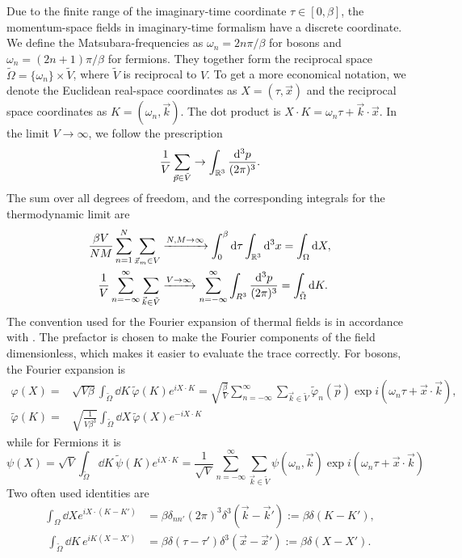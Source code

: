 Due to the finite range of the imaginary-time coordinate $\tau \in [0, \beta]$, the momentum-space fields in imaginary-time formalism have a discrete coordinate. 
We define the Matsubara-frequencies as $\omega_n = 2 n \pi / \beta$ for bosons and $\omega_n = (2n + 1) \pi / \beta$ for fermions.
They together form the reciprocal space $\tilde \Omega = \{\omega_n\}\times \tilde V$, where $\tilde V$ is reciprocal to $V$.
To get a more economical notation, we denote the Euclidean real-space coordinates as $X = (\tau, \vec x)$ and the reciprocal space coordinates as $K = (\omega_n, \vec k)$.
The dot product is $X\cdot K = \omega_n \tau + \vec k \cdot \vec x$.
In the limit $V\rightarrow \infty$, we follow the prescription
\begin{equation*}
    \frac{1}{V} \sum_{\vec p \in \tilde V} \rightarrow \int_{\mathbb{R}^3} 
    \frac{\dd^3 p}{(2 \pi)^3}.
\end{equation*}
The sum over all degrees of freedom, and the corresponding integrals for the thermodynamic limit are
\begin{align*}
     \frac{\beta V}{NM}\sum_{n=1}^N \sum_{\vec x_m \in V} 
    & \xrightarrow{N,M\rightarrow \infty} \int_{0}^\beta \dd \tau \int_{\mathbb{R}^3} \dd^3 x
    = \int_\Omega \dd X, \\
     \frac{1}{V} \sum_{n=-\infty}^\infty \sum_{\vec k \in \tilde V}
    & \xrightarrow{V \rightarrow \infty} \sum_{n=-\infty}^\infty \int_{R^3} \frac{\dd^3 p}{(2 \pi)^3}
    = \int_{\tilde \Omega} \dd K.
\end{align*}
The convention used for the Fourier expansion of thermal fields is in accordance with \cite{Kapusta:finiteTemp}. 
The prefactor is chosen to make the Fourier components of the field dimensionless, which makes it easier to evaluate the trace correctly.
For bosons, the Fourier expansion is
\begin{align*}
    \varphi(X)
    = &
    \sqrt{V \beta} \int_{\tilde \Omega} \dd K \,  \tilde \varphi(K) e^{i X\cdot K}
    =
    \sqrt{\frac{\beta}{V}} \sum_{n=-\infty}^\infty \sum_{\vec k \in \tilde V}
    \tilde \varphi_n(\vec p) \exp{i(\omega_n \tau + \vec x \cdot \vec k)}, \\
    \tilde \varphi(K)
    = &
    \sqrt{\frac{1}{V \beta^3}} \int_{\tilde \Omega} \dd X \,  \tilde \varphi(X) e^{ - i X\cdot K}
\end{align*}
while for Fermions it is
\begin{equation}
    \psi(X) 
    = \sqrt{V} \int_{\tilde \Omega} \dd K \, \tilde \psi(K) e^{i X\cdot K} 
    = \frac{1}{\sqrt{V}} \sum_{n = - \infty}^\infty \sum_{\vec k \in \tilde V}
    \psi(\omega_n, \vec k) \exp{i(\omega_n \tau + \vec x \cdot \vec k)}
\end{equation}
Two often used identities are
\begin{align}
    \label{thermal delta}
    \int_{\Omega} \dd X e^{i X\cdot(K - K')} 
    & = \beta \delta_{nn'} (2 \pi)^3 \delta^3(\vec k - \vec k') := \beta \delta(K - K'), \\\
    \int_{\tilde \Omega} \dd K \, e^{i K(X - X')} 
    & = \beta \delta (\tau - \tau') \delta^3(\vec x - \vec x') 
    := \beta \delta(X - X').
\end{align}
